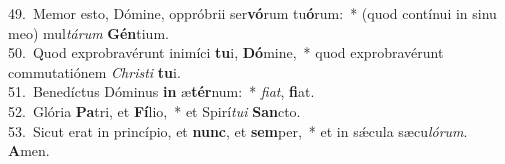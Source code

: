 {49.~}Memor esto, Dómine, oppróbrii ser\textbf{vó}rum tu\textbf{ó}rum:~* (quod contínui in sinu meo) mul\textit{tá}\textit{rum} \textbf{Gén}tium.\\
{50.~}Quod exprobravérunt inimíci \textbf{tu}i, \textbf{Dó}mine,~* quod exprobravérunt commutatiónem \textit{Chri}\textit{sti} \textbf{tu}i.\\
{51.~}Benedíctus Dóminus \textbf{in} æ\textbf{tér}num:~* \textit{fi}\textit{at}, \textbf{fi}at.\\
{52.~}Glória \textbf{Pa}tri, et \textbf{Fí}lio,~* et Spirí\textit{tu}\textit{i} \textbf{San}cto.\\
{53.~}Sicut erat in princípio, et \textbf{nunc}, et \textbf{sem}per,~* et in sǽcula sæcu\textit{ló}\textit{rum}. \textbf{A}men.\\
